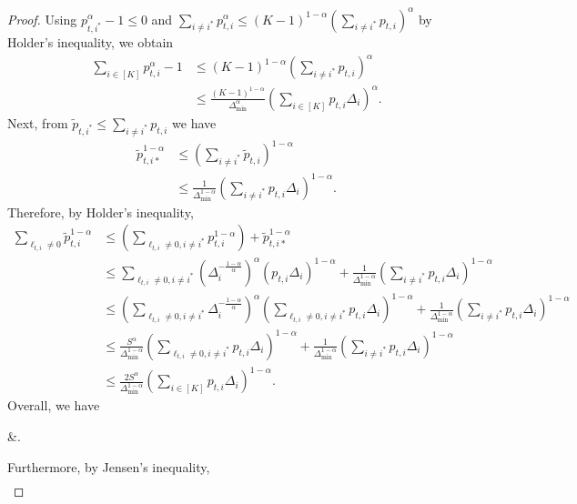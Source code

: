 \begin{proof}
Using $p_{t,i^*}^\alpha - 1 \leq 0$ and $\sum_{i \neq i^*}p_{t,i}^\alpha \leq (K-1)^{1-\alpha}(\sum_{i \neq i^*} p_{t,i})^\alpha$ by Holder's inequality, we obtain 
\begin{align*}
    \sum_{i \in [K]}p_{t,i}^\alpha - 1 &\leq (K-1)^{1-\alpha} (\sum_{i \neq i^*}p_{t,i})^\alpha\\
    &\leq \frac{(K-1)^{1-\alpha}}{\Delta_{\min}^{\alpha}}(\sum_{i \in [K]} p_{t,i}\Delta_i)^\alpha.
\end{align*}
Next, from 
{$\tilde{p}_{t,i^*} \leq \sum_{i \neq i^*}p_{t,i}$} we have 
\begin{align*}
    \tilde{p}_{t,i*}^{1-\alpha} &\leq \left(\sum_{i \neq i^*}\tilde{p}_{t,i}\right)^{1-\alpha} \\
    &\leq \frac{1}{\Delta_{\min}^{1-\alpha}}\left(\sum_{i \neq i^*}p_{t,i} \Delta_i\right)^{1-\alpha}.
\end{align*}
Therefore, by Holder's inequality,
\begin{align*}
    \sum_{\ell_{t,i} \neq 0}\tilde{p}_{t,i}^{1-\alpha} &\leq \left(\sum_{\ell_{t,i} \neq 0, i \neq i^*}p_{t,i}^{1-\alpha}\right) + \tilde{p}_{t,i*}^{1-\alpha}\\
    &\leq \sum_{\ell_{t,i} \neq 0, i \neq i^*}\left(\Delta_i^{-\frac{1-\alpha}{\alpha}}\right)^{\alpha}(p_{t,i}\Delta_i)^{1-\alpha} + \frac{1}{\Delta_{\min}^{1-\alpha}}\left(\sum_{i \neq i^*}p_{t,i} \Delta_i\right)^{1-\alpha}\\
    &\leq \left(\sum_{\ell_{t,i} \neq 0, i \neq i^*}\Delta_i^{-\frac{1-\alpha}{\alpha}}\right)^\alpha \left(\sum_{\ell_{t,i} \neq 0, i \neq i^*} p_{t,i}\Delta_i\right)^{1-\alpha} + \frac{1}{\Delta_{\min}^{1-\alpha}}\left(\sum_{i \neq i^*}p_{t,i} \Delta_i\right)^{1-\alpha}\\
    &\leq \frac{S^\alpha}{\Delta_{\min}^{1-\alpha}}\left(\sum_{\ell_{t,i} \neq 0, i \neq i^*}p_{t,i}\Delta_i\right)^{1-\alpha}  + \frac{1}{\Delta_{\min}^{1-\alpha}}\left(\sum_{i \neq i^*}p_{t,i} \Delta_i\right)^{1-\alpha}\\
    &\leq \frac{2S^\alpha}{\Delta_{\min}^{1-\alpha}}\left(\sum_{i \in [K]}p_{t,i}\Delta_i\right)^{1-\alpha}.
\end{align*}
Overall, we have
\begin{nalign}
    \E[h_tz_t] &\leq {}\E\left[\sum_{i=1}^K p_{t,i}\Delta_i\right].
    \label{eq:boundhtztbyRplusC}
\end{nalign}
Furthermore, by Jensen's inequality, 
\begin{align}

\end{align}
\end{proof}
